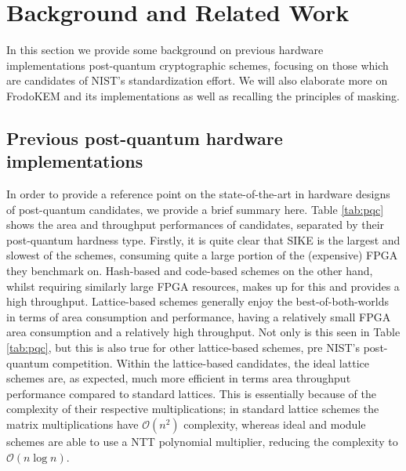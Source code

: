 \section{Background and Related Work} \label{sec:related}
  
In this section we provide some background on previous hardware implementations post-quantum cryptographic schemes, focusing on those which are candidates of NIST's standardization effort. We will also elaborate more on FrodoKEM and its implementations as well as recalling the principles of masking.

\subsection{Previous post-quantum hardware implementations}

In order to provide a reference point on the state-of-the-art in hardware designs of post-quantum candidates, we provide a brief summary here. Table \ref{tab:pqc} shows the area and throughput performances of candidates, separated by their post-quantum hardness type. Firstly, it is quite clear that SIKE is the largest and slowest of the schemes, consuming quite a large portion of the (expensive) FPGA they benchmark on. Hash-based and code-based schemes on the other hand, whilst requiring similarly large FPGA resources, makes up for this and provides a high throughput. Lattice-based schemes generally enjoy the best-of-both-worlds in terms of area consumption and performance, having a relatively small FPGA area consumption and a relatively high throughput. Not only is this seen in Table \ref{tab:pqc}, but this is also true for other lattice-based schemes, pre NIST's post-quantum competition. Within the lattice-based candidates, the ideal lattice schemes are, as expected, much more efficient in terms area throughput performance compared to standard lattices. This is essentially because of the complexity of their respective multiplications; in standard lattice schemes the matrix multiplications have $ \mathcal{O}(n^2)$ complexity, whereas ideal and module schemes are able to use a NTT polynomial multiplier, reducing the complexity to $ \mathcal{O}(n\log n)$.

